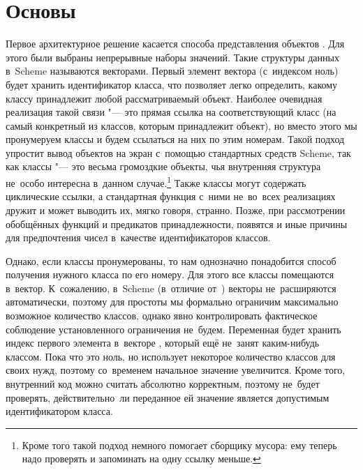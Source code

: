 \section{Основы}\label{objects/sect:foundation}

Первое архитектурное решение касается способа представления объектов
{\Meroonet}. Для этого были выбраны непрерывные наборы значений. Такие структуры
данных в~Scheme называются векторами. Первый элемент вектора (с~индексом ноль)
будет хранить идентификатор класса, что позволяет легко определить, какому
классу принадлежит любой рассматриваемый объект. Наиболее очевидная реализация
такой связи "--- это прямая ссылка на соответствующий класс (на самый конкретный
из классов, которым принадлежит объект), но вместо этого мы пронумеруем классы и
будем ссылаться на них по этим номерам. Такой подход упростит вывод объектов на
экран с~помощью стандартных средств Scheme, так как классы "--- это весьма
громоздкие объекты, чья внутренняя структура не~особо интересна в~данном
случае.\footnote*{Кроме того такой подход немного помогает сборщику мусора:
ему теперь надо проверять и запоминать на одну ссылку меньше.} Также классы
могут содержать циклические ссылки, а стандартная функция  с~ними
не~во~всех реализациях дружит и может выводить их, мягко говоря, странно. Позже,
при рассмотрении обобщённых функций и предикатов принадлежности, появятся и иные
причины для предпочтения чисел в~качестве идентификаторов классов.

Однако, если классы пронумерованы, то нам однозначно понадобится способ
получения нужного класса по его номеру. Для этого все классы помещаются
в~вектор. К~сожалению, в~Scheme (в~отличие от~{\CommonLisp}) векторы
не~расширяются автоматически, поэтому для простоты мы формально ограничим
максимально возможное количество классов, однако явно контролировать
фактическое соблюдение установленного ограничения не~будем. Переменная
 будет хранить индекс первого элемента в~векторе
, который ещё не~занят каким-нибудь классом. Пока что это ноль,
но {\Meroonet} использует некоторое количество классов для своих нужд, поэтому
со~временем начальное значение  увеличится. Кроме того,
внутренний код {\Meroonet} можно считать абсолютно корректным, поэтому
 не~будет проверять, действительно~ли переданное ей значение
является допустимым идентификатором класса.

